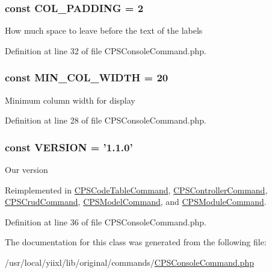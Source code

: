 \hypertarget{classCPSConsoleCommand_a4b90a6cacaef1bfd7e10e14ea54905aa}{
\subsubsection[{COL\_\-PADDING}]{\setlength{\rightskip}{0pt plus 5cm}const {\bf COL\_\-PADDING} = 2}}
\label{classCPSConsoleCommand_a4b90a6cacaef1bfd7e10e14ea54905aa}
How much space to leave before the text of the labels 

Definition at line 32 of file CPSConsoleCommand.php.

\hypertarget{classCPSConsoleCommand_a1004fff603687ed8b5826de7588fa252}{
\subsubsection[{MIN\_\-COL\_\-WIDTH}]{\setlength{\rightskip}{0pt plus 5cm}const {\bf MIN\_\-COL\_\-WIDTH} = 20}}
\label{classCPSConsoleCommand_a1004fff603687ed8b5826de7588fa252}
Minimum column width for display 

Definition at line 28 of file CPSConsoleCommand.php.

\hypertarget{classCPSConsoleCommand_af71005841ce53adac00581ab0ba24c1f}{
\subsubsection[{VERSION}]{\setlength{\rightskip}{0pt plus 5cm}const {\bf VERSION} = '1.1.0'}}
\label{classCPSConsoleCommand_af71005841ce53adac00581ab0ba24c1f}
Our version 

Reimplemented in \hyperlink{classCPSCodeTableCommand_af71005841ce53adac00581ab0ba24c1f}{CPSCodeTableCommand}, \hyperlink{classCPSControllerCommand_af71005841ce53adac00581ab0ba24c1f}{CPSControllerCommand}, \hyperlink{classCPSCrudCommand_af71005841ce53adac00581ab0ba24c1f}{CPSCrudCommand}, \hyperlink{classCPSModelCommand_af71005841ce53adac00581ab0ba24c1f}{CPSModelCommand}, and \hyperlink{classCPSModuleCommand_af71005841ce53adac00581ab0ba24c1f}{CPSModuleCommand}.



Definition at line 36 of file CPSConsoleCommand.php.



The documentation for this class was generated from the following file:\begin{DoxyCompactItemize}
\item 
/usr/local/yiixl/lib/original/commands/\hyperlink{CPSConsoleCommand_8php}{CPSConsoleCommand.php}\end{DoxyCompactItemize}
